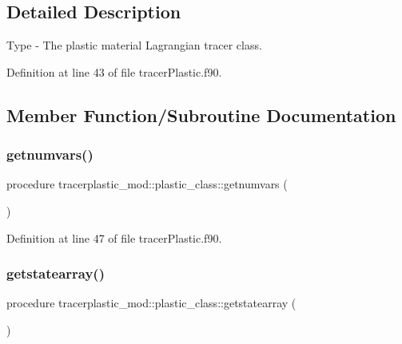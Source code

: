 \subsection{Detailed Description}
Type -\/ The plastic material Lagrangian tracer class. 

Definition at line 43 of file tracer\+Plastic.\+f90.



\subsection{Member Function/\+Subroutine Documentation}
\mbox{\label{structtracerplastic__mod_1_1plastic__class_a86eb9828ca9f40789da553d1d40fae19}} 
\subsubsection{\texorpdfstring{getnumvars()}{getnumvars()}}
{\footnotesize\ttfamily procedure tracerplastic\+\_\+mod\+::plastic\+\_\+class\+::getnumvars (\begin{DoxyParamCaption}{ }\end{DoxyParamCaption})\hspace{0.3cm}{\ttfamily [private]}}



Definition at line 47 of file tracer\+Plastic.\+f90.

\mbox{\label{structtracerplastic__mod_1_1plastic__class_a633bfd965f7964ca5d8fd9fdb7c3e2d0}} 
\subsubsection{\texorpdfstring{getstatearray()}{getstatearray()}}
{\footnotesize\ttfamily procedure tracerplastic\+\_\+mod\+::plastic\+\_\+class\+::getstatearray (\begin{DoxyParamCaption}{ }\end{DoxyParamCaption})\hspace{0.3cm}{\ttfamily [private]}}



